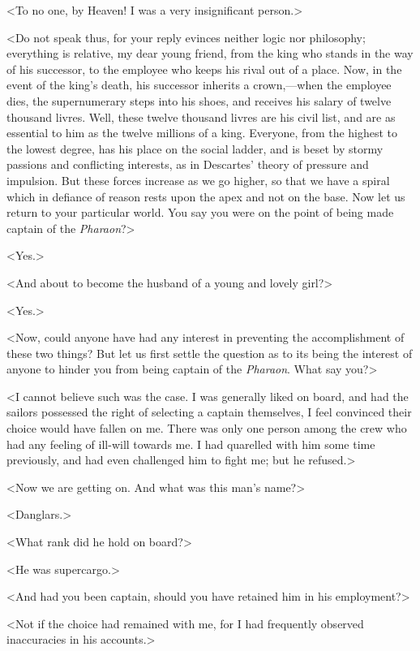  <To no one, by Heaven! I was a very insignificant person.> 

 <Do not speak thus, for your reply evinces neither logic nor philosophy; everything is relative, my dear young friend, from the king who stands in the way of his successor, to the employee who keeps his rival out of a place. Now, in the event of the king's death, his successor inherits a crown,—when the employee dies, the supernumerary steps into his shoes, and receives his salary of twelve thousand livres. Well, these twelve thousand livres are his civil list, and are as essential to him as the twelve millions of a king. Everyone, from the highest to the lowest degree, has his place on the social ladder, and is beset by stormy passions and conflicting interests, as in Descartes' theory of pressure and impulsion. But these forces increase as we go higher, so that we have a spiral which in defiance of reason rests upon the apex and not on the base. Now let us return to your particular world. You say you were on the point of being made captain of the \textit{Pharaon}?> 

 <Yes.> 

 <And about to become the husband of a young and lovely girl?> 

 <Yes.> 

 <Now, could anyone have had any interest in preventing the accomplishment of these two things? But let us first settle the question as to its being the interest of anyone to hinder you from being captain of the \textit{Pharaon}. What say you?> 

 <I cannot believe such was the case. I was generally liked on board, and had the sailors possessed the right of selecting a captain themselves, I feel convinced their choice would have fallen on me. There was only one person among the crew who had any feeling of ill-will towards me. I had quarelled with him some time previously, and had even challenged him to fight me; but he refused.> 

 <Now we are getting on. And what was this man's name?> 

 <Danglars.> 

 <What rank did he hold on board?> 

 <He was supercargo.> 

 <And had you been captain, should you have retained him in his employment?> 

 <Not if the choice had remained with me, for I had frequently observed inaccuracies in his accounts.> 

